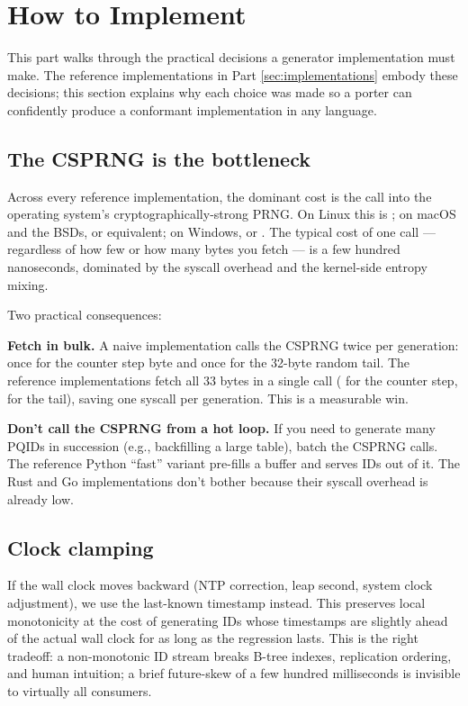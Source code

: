 \section{How to Implement}
\label{sec:how}

This part walks through the practical decisions a generator implementation must make. The reference implementations in Part \ref{sec:implementations} embody these decisions; this section explains why each choice was made so a porter can confidently produce a conformant implementation in any language.

\subsection{The CSPRNG is the bottleneck}

Across every reference implementation, the dominant cost is the call into the operating system's cryptographically-strong PRNG. On Linux this is ; on macOS and the BSDs,  or equivalent; on Windows,  or . The typical cost of one call --- regardless of how few or how many bytes you fetch --- is a few hundred nanoseconds, dominated by the syscall overhead and the kernel-side entropy mixing.

Two practical consequences:

\textbf{Fetch in bulk.} A naive implementation calls the CSPRNG twice per generation: once for the counter step byte and once for the 32-byte random tail. The reference implementations fetch all 33 bytes in a single call ( for the counter step,  for the tail), saving one syscall per generation. This is a measurable win.

\textbf{Don't call the CSPRNG from a hot loop.} If you need to generate many PQIDs in succession (e.g., backfilling a large table), batch the CSPRNG calls. The reference Python ``fast'' variant pre-fills a buffer and serves IDs out of it. The Rust and Go implementations don't bother because their syscall overhead is already low.

\subsection{Clock clamping}

If the wall clock moves backward (NTP \citep{rfc5905} correction, leap second, system clock adjustment), we use the last-known timestamp instead. This preserves local monotonicity at the cost of generating IDs whose timestamps are slightly ahead of the actual wall clock for as long as the regression lasts. This is the right tradeoff: a non-monotonic ID stream breaks B-tree indexes, replication ordering, and human intuition; a brief future-skew of a few hundred milliseconds is invisible to virtually all consumers.

